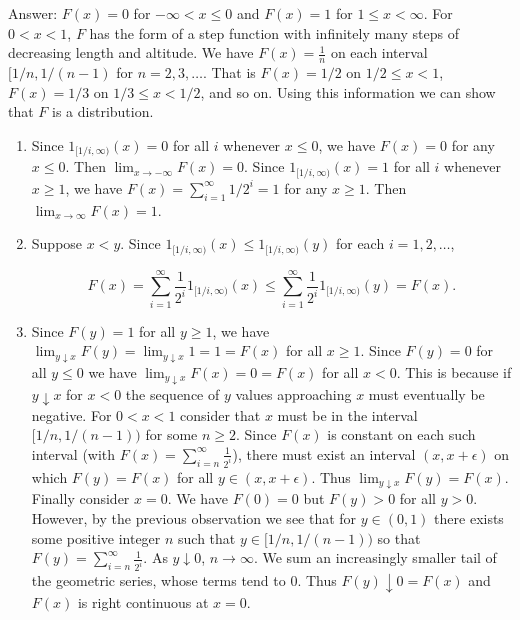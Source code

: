 \documentclass{article}
\begin{document}
Answer: $F(x) = 0$ for $-\infty < x \leq 0$ and $F(x) = 1$  for $1 \leq x < \infty$. For $0<x<1$, $F$ has the form of a step function with infinitely many steps of decreasing length and altitude. We have $F(x) = \frac{1}{n}$ on each interval $[1/n, 1/(n-1)$ for $n = 2,3,\dots$. That is $F(x) = 1/2$ on $1/2 \leq x < 1$, $F(x) = 1/3$ on $1/3 \leq x < 1/2$, and so on. Using this information we can show that $F$ is a distribution. 

\begin{enumerate}
\item Since $1_{[1/i, \infty)}(x) = 0$ for all $i$ whenever $x \leq 0$, we have $F(x) = 0$ for any $x \leq 0$. Then $\lim_{x\rightarrow -\infty} F(x) = 0$. Since $1_{[1/i, \infty)}(x) = 1$ for all $i$ whenever $x \geq 1$, we have $F(x) = \sum_{i = 1}^\infty 1/2^i = 1$ for any $x \geq 1$. Then $\lim_{x \rightarrow \infty} F(x) = 1$.

\item Suppose $x < y$. Since $1_{[1/i , \infty)}(x) \leq 1_{[1/i, \infty)}(y)$ for each $i = 1,2,\dots$,

$$
F(x) = \sum_{i=1}^\infty \frac{1}{2^i}1_{[1/i, \infty)}(x) \leq \sum_{i=1}^\infty \frac{1}{2^i}1_{[1/i, \infty)}(y) = F(x).
$$

\item Since $F(y) = 1$ for all $y \geq 1$, we have $\lim_{y \downarrow x} F(y) = \lim_{y \downarrow x} 1 = 1 = F(x)$ for all $x \geq 1$. Since $F(y) = 0$ for all $y \leq 0$ we have $\lim_{y \downarrow x} F(x) = 0 = F(x)$ for all $x < 0$. This is because if $y\downarrow x$ for $x<0$ the sequence of $y$ values approaching $x$ must eventually be negative. For $0<x<1$ consider that $x$ must be in the interval $[1/n, 1/(n-1))$ for some $n \geq 2$. Since $F(x)$ is constant on each such interval (with $F(x) = \sum_{i=n}^\infty \frac{1}{2^i}$), there must exist an interval $(x,x + \epsilon)$ on which $F(y) = F(x)$ for all $y \in (x,x+\epsilon)$. Thus $\lim_{y \downarrow x} F(y) = F(x)$. Finally consider $x = 0$. We have $F(0) = 0$ but $F(y) > 0$ for all $y > 0$. However, by the previous observation we see that for $y \in (0,1)$ there exists some positive integer $n$ such that $y \in [1/n, 1/(n-1))$ so that $F(y) = \sum_{i=n}^\infty \frac{1}{2^i}$. As $y \downarrow 0$, $n \rightarrow \infty$. We sum an increasingly smaller tail of the geometric series, whose terms tend to 0. Thus $F(y) \downarrow 0 = F(x)$ and $F(x)$ is right continuous at $x = 0$. 
\end{enumerate}
\end{document}
